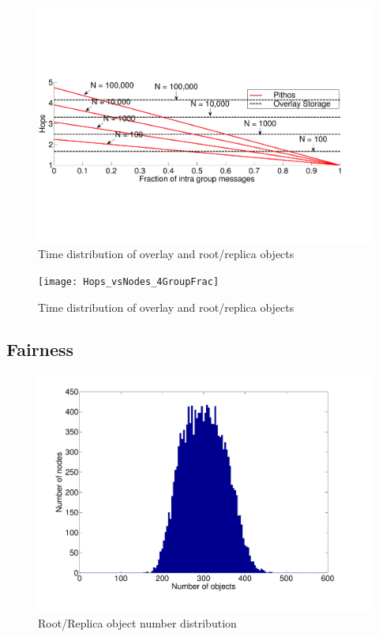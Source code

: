 \documentclass[10pt,a4paper,conference]{IEEEtran}
\begin{document}
\begin{figure}[htbp]
 \centering
 \includegraphics[clip=true, viewport=2cm 1cm 27cm 19.5cm, width=\columnwidth]{Hops_vsGroupFrac_4n}
 \caption{Time distribution of overlay and root/replica objects}
 \label{fig_pithos_response}
\end{figure}

\begin{figure}[htbp]
 \centering
 \texttt{[image: Hops\_vsNodes\_4GroupFrac]}
 \caption{Time distribution of overlay and root/replica objects}
 \label{fig_pithos_response}
\end{figure}

\subsection{Fairness}

\begin{figure}[htbp]
 \centering
 \includegraphics[clip=true, viewport=1.5cm 1.8cm 26.5cm 20cm, width=\columnwidth]{RootRepObjects}
 \caption{Root/Replica object number distribution}
 \label{fig_pithos_response}
\end{figure}
\end{document}

